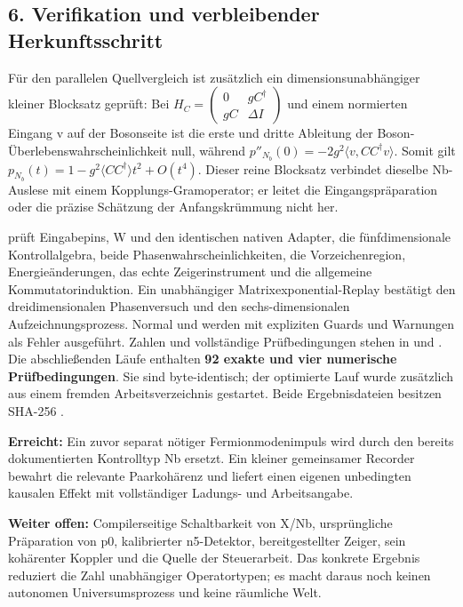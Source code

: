 \subsection{6. Verifikation und verbleibender
Herkunftsschritt}\label{verifikation-und-verbleibender-herkunftsschritt}

Für den parallelen Quellvergleich ist zusätzlich ein
dimensionsunabhängiger kleiner Blocksatz geprüft: Bei
\(H_C=\left(\begin{smallmatrix}0&gC^\dagger\\gC&\Delta I\end{smallmatrix}\right)\)
und einem normierten Eingang v auf der Bosonseite ist die erste und
dritte Ableitung der Boson-Überlebenswahrscheinlichkeit null, während
\(p''_{N_b}(0)=-2g^2\langle v,CC^\dagger v\rangle\). Somit gilt
\(p_{N_b}(t)=1-g^2\langle CC^\dagger\rangle t^2+O(t^4)\). Dieser reine
Blocksatz verbindet dieselbe Nb-Auslese mit einem
Kopplungs-Gramoperator; er leitet die Eingangspräparation oder die
präzise Schätzung der Anfangskrümmung nicht her.

 prüft Eingabepins, W und den identischen
nativen Adapter, die fünfdimensionale Kontrollalgebra, beide
Phasenwahrscheinlichkeiten, die Vorzeichenregion, Energieänderungen, das
echte Zeigerinstrument und die allgemeine Kommutatorinduktion. Ein
unabhängiger Matrixexponential-Replay bestätigt den dreidimensionalen
Phasenversuch und den sechs-dimensionalen Aufzeichnungsprozess. Normal
und  werden mit expliziten Guards und Warnungen als Fehler
ausgeführt. Zahlen und vollständige Prüfbedingungen stehen in
 und
. Die abschließenden Läufe enthalten
\textbf{92 exakte und vier numerische Prüfbedingungen}. Sie sind
byte-identisch; der optimierte Lauf wurde zusätzlich aus einem fremden
Arbeitsverzeichnis gestartet. Beide Ergebnisdateien besitzen SHA-256
.

\textbf{Erreicht:} Ein zuvor separat nötiger Fermionmodenimpuls wird
durch den bereits dokumentierten Kontrolltyp Nb ersetzt. Ein kleiner
gemeinsamer Recorder bewahrt die relevante Paarkohärenz und liefert
einen eigenen unbedingten kausalen Effekt mit vollständiger Ladungs- und
Arbeitsangabe.

\textbf{Weiter offen:} Compilerseitige Schaltbarkeit von X/Nb,
ursprüngliche Präparation von p0, kalibrierter n5-Detektor,
bereitgestellter Zeiger, sein kohärenter Koppler und die Quelle der
Steuerarbeit. Das konkrete Ergebnis reduziert die Zahl unabhängiger
Operatortypen; es macht daraus noch keinen autonomen Universumsprozess
und keine räumliche Welt.

